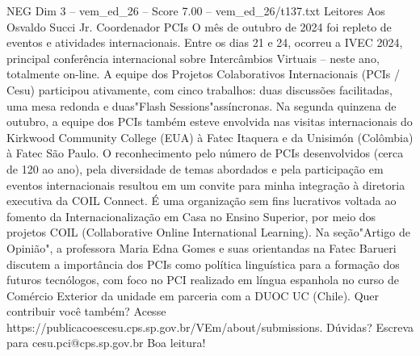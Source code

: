 \begin{textsample}{NEG Dim 3 – vem\_ed\_26 – Score 7.00 – vem\_ed\_26/t137.txt}  \label{ex:f3_neg_158}
Leitores Aos Osvaldo Succi Jr.
Coordenador PCIs O mês de outubro de 2024 foi repleto de eventos e atividades internacionais.
Entre os dias 21 e 24, ocorreu a IVEC 2024, principal conferência internacional sobre Intercâmbios Virtuais – neste ano, totalmente on-line.
A equipe dos Projetos Colaborativos Internacionais (PCIs / Cesu) participou ativamente, com cinco trabalhos: duas discussões facilitadas, uma mesa redonda e duas"Flash Sessions"assíncronas.
Na segunda quinzena de outubro, a equipe dos PCIs também esteve envolvida nas visitas internacionais do Kirkwood Community College (EUA) à Fatec Itaquera e da Unisimón (Colômbia) à Fatec São Paulo.
O reconhecimento pelo número de PCIs desenvolvidos (cerca de 120 ao ano), pela diversidade de temas abordados e pela participação em eventos internacionais resultou em um convite para minha integração à diretoria executiva da COIL Connect.
É uma organização sem fins lucrativos voltada ao fomento da Internacionalização em Casa no Ensino Superior, por meio dos projetos COIL (Collaborative Online International Learning).
Na seção"Artigo de Opinião", a professora Maria Edna Gomes e suas orientandas na Fatec Barueri discutem a importância dos PCIs como política linguística para a formação dos futuros tecnólogos, com foco no PCI realizado em língua espanhola no curso de Comércio Exterior da unidade em parceria com a DUOC UC (Chile).
Quer contribuir você também?
Acesse https://publicacoescesu.cps.sp.gov.br/VEm/about/submissions.
Dúvidas?
Escreva para cesu.pci@cps.sp.gov.br Boa leitura!

\end{textsample}
